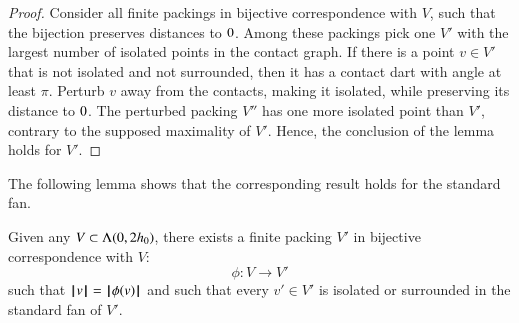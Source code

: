 \begin{proof} Consider all finite packings in 
bijective correspondence with $V$, such that the
bijection preserves distances to $0$.
Among these packings pick one $V'$ with the largest number
of isolated points in the contact graph.  If there is a point $v\in V'$ that
is not isolated and not surrounded, then it has a contact
dart with angle at least $\pi$.   Perturb $v$ away from the contacts, making it isolated, while preserving its distance to $0$.  The perturbed packing $V''$ has one more isolated point than $V'$, contrary to the supposed maximality of $V'$.  Hence, the conclusion of the 
lemma holds for $V'$.
\end{proof}

The following lemma shows that the corresponding result
holds for the standard fan.

\begin{lemma}\label{lemma:surrounded}  
Given any $V\subset \Lambda(0,2{h_0})$,
there exists a finite packing $V'$ 
in bijective correspondence with $V$:
$$
\phi:V\to V'
$$
such that ${{\hskip0.1em|\hskip-0.15em|\hskip0.1em}v{\hskip0.1em|\hskip-0.15em|\hskip0.1em}} = {{\hskip0.1em|\hskip-0.15em|\hskip0.1em}\phi(v){\hskip0.1em|\hskip-0.15em|\hskip0.1em}}$ and
such that every $v'\in V'$
is isolated or surrounded in the standard fan of $V'$.
\end{lemma}

